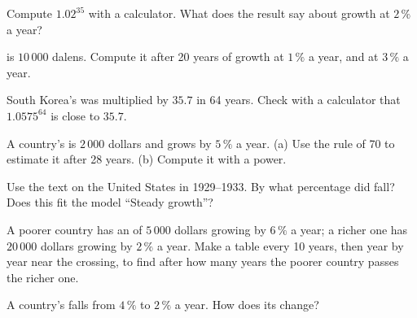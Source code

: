 \begin{exercise}[$\star\star$]\label{exo:g8:growth-and-compounding:5}
Compute $1.02^{35}$ with a calculator. What does the result say about growth at $2\,\%$ a year?
\end{exercise}

\begin{exercise}[$\star\star$]\label{exo:g8:growth-and-compounding:6}
 is $10\,000$ dalens. Compute it after 20 years of growth at $1\,\%$ a year, and at
$3\,\%$ a year.
\end{exercise}

\begin{exercise}[$\star\star$]\label{exo:g8:growth-and-compounding:7}
South Korea's  was multiplied by $35.7$ in 64 years. Check with a calculator that
$1.0575^{64}$ is close to $35.7$.
\end{exercise}

\begin{exercise}[$\star\star$]\label{exo:g8:growth-and-compounding:8}
A country's  is $2\,000$ dollars and grows by $5\,\%$ a year. (a) Use the rule of 70
to estimate it after 28 years. (b) Compute it with a power.
\end{exercise}

\begin{exercise}[$\star\star$]\label{exo:g8:growth-and-compounding:9}
Use the text on the United States in 1929--1933. By what percentage did  fall? Does this
fit the model ``Steady growth''?
\end{exercise}

\begin{exercise}[$\star\star\star$]\label{exo:g8:growth-and-compounding:10}
A poorer country has an  of $5\,000$ dollars growing by $6\,\%$ a year; a richer one
has $20\,000$ dollars growing by $2\,\%$ a year. Make a table every 10 years, then year by year near
the crossing, to find after how many years the poorer country passes the richer one.
\end{exercise}

\begin{exercise}[$\star\star\star$]\label{exo:g8:growth-and-compounding:11}
A country's  falls from $4\,\%$ to $2\,\%$ a year. How does its  change?
\end{exercise}

